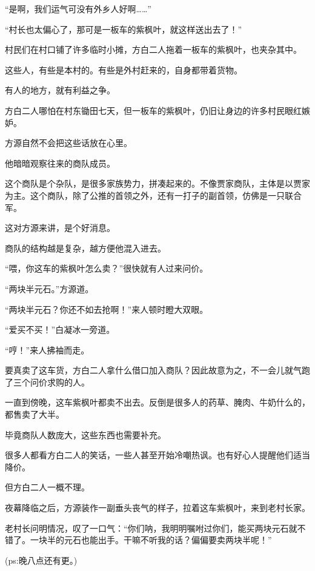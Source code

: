 \begin{this_body}
“是啊，我们运气可没有外乡人好啊……”

“村长也太偏心了，那可是一板车的紫枫叶，就这样送出去了！”

村民们在村口铺了许多临时小摊，方白二人拖着一板车的紫枫叶，也夹杂其中。

这些人，有些是本村的。有些是外村赶来的，自身都带着货物。

有人的地方，就有利益之争。

方白二人哪怕在村东锄田七天，但一板车的紫枫叶，仍旧让身边的许多村民眼红嫉妒。

方源自然不会把这些话放在心里。

他暗暗观察往来的商队成员。

这个商队是个杂队，是很多家族势力，拼凑起来的。不像贾家商队，主体是以贾家为主。这个商队，除了公推的首领之外，还有一打子的副首领，仿佛是一只联合军。

这对方源来讲，是个好消息。

商队的结构越是复杂，越方便他混入进去。

“喂，你这车的紫枫叶怎么卖？”很快就有人过来问价。

“两块半元石。”方源道。

“两块半元石？你还不如去抢啊！”来人顿时瞪大双眼。

“爱买不买！”白凝冰一旁道。

“哼！”来人拂袖而走。

要真卖了这车货，方白二人拿什么借口加入商队？因此故意为之，不一会儿就气跑了三个问价求购的人。

一直到傍晚，这车紫枫叶都卖不出去。反倒是很多人的药草、腌肉、牛奶什么的，都售卖了大半。

毕竟商队人数庞大，这些东西也需要补充。

很多人都看方白二人的笑话，一些人甚至开始冷嘲热讽。也有好心人提醒他们适当降价。

但方白二人一概不理。

夜幕降临之后，方源装作一副垂头丧气的样子，拉着这车紫枫叶，来到老村长家。

老村长问明情况，叹了一口气：“你们呐，我明明嘱咐过你们，能买两块元石就不错了。一块半的元石也能出手。干嘛不听我的话？偏偏要卖两块半呢！”

(ps:晚八点还有更。)

\end{this_body}

